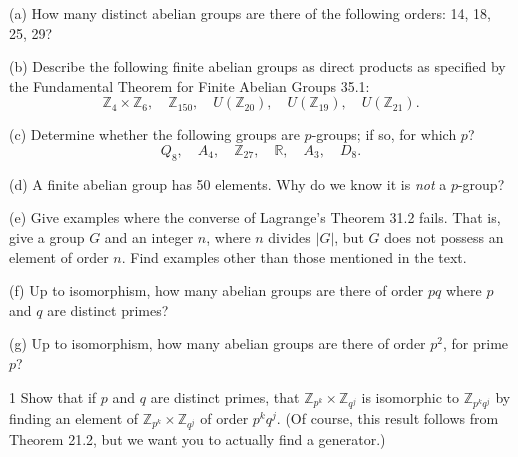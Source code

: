 \begin{problem}[Warmup]{(a)}
    How many distinct abelian groups are there of the following orders: 14, 18, 25, 29?
\end{problem}
\unsolved

\begin{problem}[Warmup]{(b)}
    Describe the following finite abelian groups as direct products as specified by the Fundamental Theorem for Finite Abelian Groups 35.1: \[\mathbb{Z}_4 \times \mathbb{Z}_6, \quad \mathbb{Z}_{150}, \quad U(\mathbb{Z}_{20}), \quad U(\mathbb{Z}_{19}), \quad U(\mathbb{Z}_{21}).\]
\end{problem}
\unsolved

\begin{problem}[Warmup]{(c)}
    Determine whether the following groups are $p$-groups; if so, for which $p$? \[Q_8, \quad A_4, \quad \mathbb{Z}_{27}, \quad \mathbb{R}, \quad A_3, \quad D_8.\]
\end{problem}
\unsolved

\begin{problem}[Warmup]{(d)}
    A finite abelian group has 50 elements. Why do we know it is \emph{not} a $p$-group?
\end{problem}
\unsolved

\begin{problem}[Warmup]{(e)}
    Give examples where the converse of Lagrange's Theorem 31.2 fails. That is, give a group $G$ and an integer $n$, where $n$ divides $|G|$, but $G$ does not possess an element of order $n$. Find examples other than those mentioned in the text.
\end{problem}
\unsolved

\begin{problem}[Warmup]{(f)}
    Up to isomorphism, how many abelian groups are there of order $pq$ where $p$ and $q$ are distinct primes?
\end{problem}
\unsolved

\begin{problem}[Warmup]{(g)}
    Up to isomorphism, how many abelian groups are there of order $p^2$, for prime $p$?
\end{problem}
\unsolved

\begin{problem}{1}
    Show that if $p$ and $q$ are distinct primes, that
    $\mathbb{Z}_{p^k} \times \mathbb{Z}_{q^j}$ is isomorphic to $\mathbb{Z}_{p^kq^j}$ by
    finding an element of $\mathbb{Z}_{p^k} \times \mathbb{Z}_{q^j}$ of order $p^kq^j$.
    (Of course, this result follows from Theorem 21.2, but we want you to actually find a
    generator.)
\end{problem}
\unsolved

